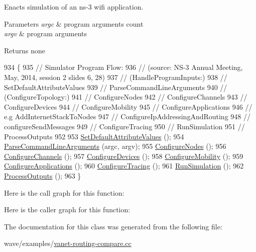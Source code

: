 Enacts simulation of an ns-\/3 wifi application. 


\begin{DoxyParams}{Parameters}
{\em argc} & program arguments count \\
\hline
{\em argv} & program arguments \\
\hline
\end{DoxyParams}
\begin{DoxyReturn}{Returns}
none 
\end{DoxyReturn}

\begin{DoxyCode}
934 \{
935   \textcolor{comment}{// Simulator Program Flow:}
936   \textcolor{comment}{// (source:  NS-3 Annual Meeting, May, 2014, session 2 slides 6, 28)}
937   \textcolor{comment}{//   (HandleProgramInputs:)}
938   \textcolor{comment}{//   SetDefaultAttributeValues}
939   \textcolor{comment}{//   ParseCommandLineArguments}
940   \textcolor{comment}{//   (ConfigureTopology:)}
941   \textcolor{comment}{//   ConfigureNodes}
942   \textcolor{comment}{//   ConfigureChannels}
943   \textcolor{comment}{//   ConfigureDevices}
944   \textcolor{comment}{//   ConfigureMobility}
945   \textcolor{comment}{//   ConfigureApplications}
946   \textcolor{comment}{//     e.g AddInternetStackToNodes}
947   \textcolor{comment}{//         ConfigureIpAddressingAndRouting}
948   \textcolor{comment}{//         configureSendMessages}
949   \textcolor{comment}{//   ConfigureTracing}
950   \textcolor{comment}{//   RunSimulation}
951   \textcolor{comment}{//   ProcessOutputs}
952 
953   \hyperlink{classWifiApp_aeff366712591e16d32a08a07a11b53cb}{SetDefaultAttributeValues} ();
954   \hyperlink{classWifiApp_a5b5615c4bf7856b9730528673228eea0}{ParseCommandLineArguments} (argc, argv);
955   \hyperlink{classWifiApp_aa9f2613b65053b54e22a4bffc795782e}{ConfigureNodes} ();
956   \hyperlink{classWifiApp_a5403723e14e754f18aa239e7e065bad6}{ConfigureChannels} ();
957   \hyperlink{classWifiApp_aee8f24cd14672226889e0572fe3cc4e3}{ConfigureDevices} ();
958   \hyperlink{classWifiApp_ae87293d372770735bf56f656aaac7124}{ConfigureMobility} ();
959   \hyperlink{classWifiApp_acd6503492b29fd6fa8fdb5294f5c36b4}{ConfigureApplications} ();
960   \hyperlink{classWifiApp_ab837fec53e4142eca00c0749cb8f692d}{ConfigureTracing} ();
961   \hyperlink{classWifiApp_a8adb2f30283df664f715611818217adc}{RunSimulation} ();
962   \hyperlink{classWifiApp_af0f4fc85e025789248d1652acb556f4a}{ProcessOutputs} ();
963 \}
\end{DoxyCode}


Here is the call graph for this function\+:




Here is the caller graph for this function\+:




The documentation for this class was generated from the following file\+:\begin{DoxyCompactItemize}
\item 
wave/examples/\hyperlink{vanet-routing-compare_8cc}{vanet-\/routing-\/compare.\+cc}\end{DoxyCompactItemize}
